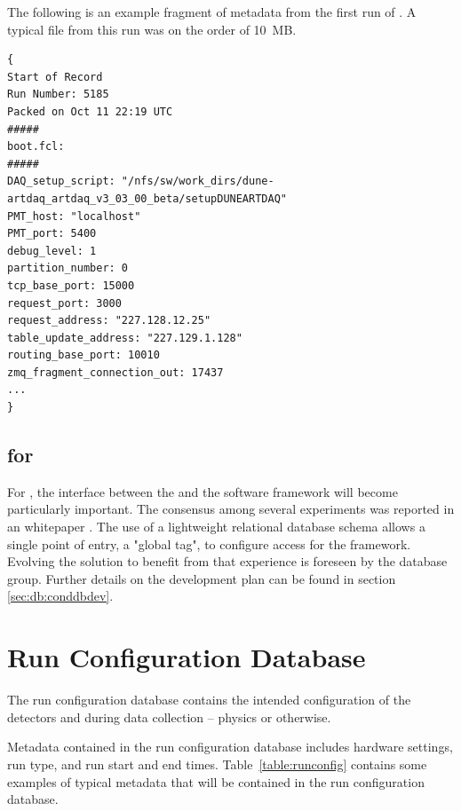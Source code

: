 \documentclass[../main-v1.tex]{subfiles}
\begin{document}
The following is an example fragment of  metadata from the first run of  . A typical file from this run was on the order of 10~MB.  

\begin{verbatim}
{
Start of Record
Run Number: 5185
Packed on Oct 11 22:19 UTC
#####
boot.fcl:
#####
DAQ_setup_script: "/nfs/sw/work_dirs/dune-artdaq_artdaq_v3_03_00_beta/setupDUNEARTDAQ" 
PMT_host: "localhost" 
PMT_port: 5400 
debug_level: 1 
partition_number: 0 
tcp_base_port: 15000 
request_port: 3000 
request_address: "227.128.12.25" 
table_update_address: "227.129.1.128" 
routing_base_port: 10010 
zmq_fragment_connection_out: 17437 
...
}
\end{verbatim}


\subsection{ for }

For , the interface between the  and the software framework will become particularly important.  The consensus among several  experiments was reported in an  whitepaper \cite{Laycock:2019ynk}. The use of a lightweight relational database schema allows a single point of entry, a "global tag", to configure  access for the framework.  Evolving the  solution to benefit from that experience is foreseen by the database group. Further details on the development plan can be found in section \ref{sec:db:conddbdev}.

\section{Run Configuration Database  }
\label{sec:db:config}  

The run configuration database contains the intended configuration of the detectors and  during data collection -- physics or otherwise. 

Metadata contained in the run configuration database includes hardware settings, run type, and run start and end times. Table~\ref{table:runconfig} contains some examples of typical metadata that will be contained in the run configuration database. 
\end{document}
